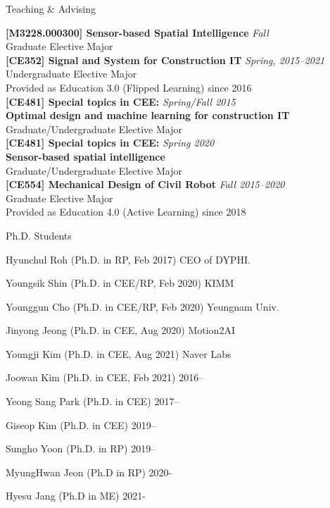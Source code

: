 \begin{rSection}{Teaching \& Advising}

{\bf[M3228.000300] Sensor-based Spatial Intelligence} \hfill {\em Fall} \\
Graduate Elective Major \\

{\bf[CE352] Signal and System for Construction IT} \hfill {\em Spring, 2015--2021} \\
Undergraduate Elective Major \\
Provided as Education 3.0 (Flipped Learning) since 2016\\

{\bf[CE481] Special topics in CEE:} \hfill {\em Spring/Fall 2015} \\
{\bf Optimal design and machine learning for construction IT}\\
Graduate/Undergraduate Elective Major \\

{\bf[CE481] Special topics in CEE:} \hfill {\em Spring 2020} \\
{\bf Sensor-based spatial intelligence}\\
Graduate/Undergraduate Elective Major \\

{\bf[CE554] Mechanical Design of Civil Robot } \hfill {\em Fall 2015--2020} \\
Graduate Elective Major \\
Provided as Education 4.0 (Active Learning) since 2018\\

\begin{rSubsection}{Ph.D. Students}{}{}{}
  \item Hyunchul Roh (Ph.D. in \acf{RP}, Feb 2017) \hfill CEO of DYPHI.
  \item Youngsik Shin (Ph.D. in \ac{CEE}/\ac{RP}, Feb 2020) \hfill KIMM
  \item Younggun Cho (Ph.D. in \ac{CEE}/\ac{RP}, Feb 2020) \hfill Yeungnam Univ.
  \item Jinyong Jeong (Ph.D. in \ac{CEE}, Aug 2020) \hfill Motion2AI
  \item Youngji Kim (Ph.D. in \ac{CEE}, Aug 2021) \hfill Naver Labs
  \item Joowan Kim (Ph.D. in \ac{CEE}, Feb 2021) \hfill 2016--
  \item Yeong Sang Park (Ph.D. in \ac{CEE}) \hfill 2017--
  \item Giseop Kim (Ph.D. in \ac{CEE}) \hfill 2019--
  \item Sungho Yoon (Ph.D. in \ac{RP}) \hfill 2019--
  \item MyungHwan Jeon (Ph.D in \ac{RP}) \hfill 2020-
  \item Hyesu Jang (Ph.D in \ac{ME}) \hfill 2021-
\end{rSubsection}


\end{rSection}
